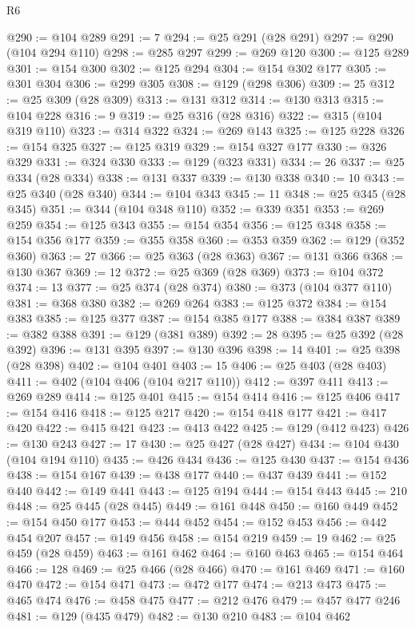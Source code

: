 \begin{lexlean}{R6}
\begin{coremodule}
@290 := @104 @289
@291 := 7
@294 := @25 @291 (@28 @291)
@297 := @290 (@104 @294 @110)
@298 := @285 @297
@299 := @269 @120
@300 := @125 @289
@301 := @154 @300
@302 := @125 @294
@304 := @154 @302 @177
@305 := @301 @304
@306 := @299 @305
@308 := @129 (@298 @306)
@309 := 25
@312 := @25 @309 (@28 @309)
@313 := @131 @312
@314 := @130 @313
@315 := @104 @228
@316 := 9
@319 := @25 @316 (@28 @316)
@322 := @315 (@104 @319 @110)
@323 := @314 @322
@324 := @269 @143
@325 := @125 @228
@326 := @154 @325
@327 := @125 @319
@329 := @154 @327 @177
@330 := @326 @329
@331 := @324 @330
@333 := @129 (@323 @331)
@334 := 26
@337 := @25 @334 (@28 @334)
@338 := @131 @337
@339 := @130 @338
@340 := 10
@343 := @25 @340 (@28 @340)
@344 := @104 @343
@345 := 11
@348 := @25 @345 (@28 @345)
@351 := @344 (@104 @348 @110)
@352 := @339 @351
@353 := @269 @259
@354 := @125 @343
@355 := @154 @354
@356 := @125 @348
@358 := @154 @356 @177
@359 := @355 @358
@360 := @353 @359
@362 := @129 (@352 @360)
@363 := 27
@366 := @25 @363 (@28 @363)
@367 := @131 @366
@368 := @130 @367
@369 := 12
@372 := @25 @369 (@28 @369)
@373 := @104 @372
@374 := 13
@377 := @25 @374 (@28 @374)
@380 := @373 (@104 @377 @110)
@381 := @368 @380
@382 := @269 @264
@383 := @125 @372
@384 := @154 @383
@385 := @125 @377
@387 := @154 @385 @177
@388 := @384 @387
@389 := @382 @388
@391 := @129 (@381 @389)
@392 := 28
@395 := @25 @392 (@28 @392)
@396 := @131 @395
@397 := @130 @396
@398 := 14
@401 := @25 @398 (@28 @398)
@402 := @104 @401
@403 := 15
@406 := @25 @403 (@28 @403)
@411 := @402 (@104 @406 (@104 @217 @110))
@412 := @397 @411
@413 := @269 @289
@414 := @125 @401
@415 := @154 @414
@416 := @125 @406
@417 := @154 @416
@418 := @125 @217
@420 := @154 @418 @177
@421 := @417 @420
@422 := @415 @421
@423 := @413 @422
@425 := @129 (@412 @423)
@426 := @130 @243
@427 := 17
@430 := @25 @427 (@28 @427)
@434 := @104 @430 (@104 @194 @110)
@435 := @426 @434
@436 := @125 @430
@437 := @154 @436
@438 := @154 @167
@439 := @438 @177
@440 := @437 @439
@441 := @152 @440
@442 := @149 @441
@443 := @125 @194
@444 := @154 @443
@445 := 210
@448 := @25 @445 (@28 @445)
@449 := @161 @448
@450 := @160 @449
@452 := @154 @450 @177
@453 := @444 @452
@454 := @152 @453
@456 := @442 @454 @207
@457 := @149 @456
@458 := @154 @219
@459 := 19
@462 := @25 @459 (@28 @459)
@463 := @161 @462
@464 := @160 @463
@465 := @154 @464
@466 := 128
@469 := @25 @466 (@28 @466)
@470 := @161 @469
@471 := @160 @470
@472 := @154 @471
@473 := @472 @177
@474 := @213 @473
@475 := @465 @474
@476 := @458 @475
@477 := @212 @476
@479 := @457 @477 @246
@481 := @129 (@435 @479)
@482 := @130 @210
@483 := @104 @462

\end{coremodule}
\end{lexlean}
